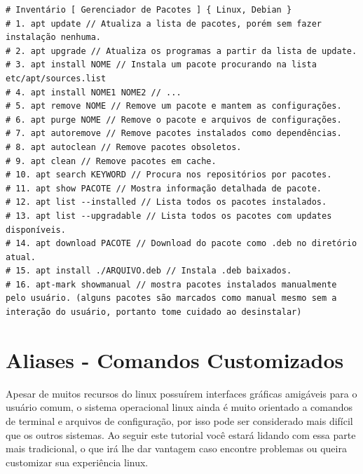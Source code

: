 \documentclass[12pt,a4paper]{article}
\begin{document}

\begin{lstlisting}
# Inventário [ Gerenciador de Pacotes ] { Linux, Debian }
# 1. apt update // Atualiza a lista de pacotes, porém sem fazer instalação nenhuma.
# 2. apt upgrade // Atualiza os programas a partir da lista de update.
# 3. apt install NOME // Instala um pacote procurando na lista etc/apt/sources.list 
# 4. apt install NOME1 NOME2 // ... 
# 5. apt remove NOME // Remove um pacote e mantem as configurações.
# 6. apt purge NOME // Remove o pacote e arquivos de configurações. 
# 7. apt autoremove // Remove pacotes instalados como dependências.
# 8. apt autoclean // Remove pacotes obsoletos. 
# 9. apt clean // Remove pacotes em cache. 
# 10. apt search KEYWORD // Procura nos repositórios por pacotes.
# 11. apt show PACOTE // Mostra informação detalhada de pacote.
# 12. apt list --installed // Lista todos os pacotes instalados. 
# 13. apt list --upgradable // Lista todos os pacotes com updates disponíveis.
# 14. apt download PACOTE // Download do pacote como .deb no diretório atual.
# 15. apt install ./ARQUIVO.deb // Instala .deb baixados.
# 16. apt-mark showmanual // mostra pacotes instalados manualmente pelo usuário. (alguns pacotes são marcados como manual mesmo sem a interação do usuário, portanto tome cuidado ao desinstalar)
\end{lstlisting}

\newpage
\section{Aliases - Comandos Customizados}

\hspace{\baselineskip}

Apesar de muitos recursos do linux possuírem interfaces gráficas amigáveis para o usuário comum, o sistema operacional linux ainda é muito orientado a comandos de terminal e arquivos de configuração, por isso pode ser considerado mais difícil que os outros sistemas. Ao seguir este tutorial você estará lidando com essa parte mais tradicional, o que irá lhe dar vantagem caso encontre problemas ou queira customizar sua experiência linux. \\
\end{document}
